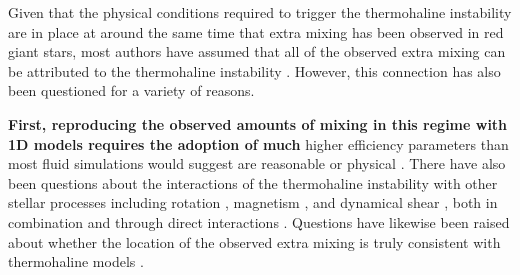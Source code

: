 




Given that the physical conditions required to trigger the thermohaline instability are in place at around the same time that extra mixing has been observed in red giant stars, 
most authors have assumed that all of the observed extra mixing can be attributed to the thermohaline instability \citep[e.g.][]{Kirby2016, Charbonnel2020, Magrini2021a}. However, this connection has also been questioned for a variety of reasons. 

\textbf{First, reproducing the observed amounts of mixing in this regime with 1D models requires the adoption of much} higher efficiency parameters than most fluid simulations would suggest are reasonable or physical \citep{Denissenkov2010thermohaline, denissenkov_merryfield_2011, traxler_etal_2011, brown_etal_2013}. There have also been questions about the interactions of the thermohaline instability with other stellar processes including rotation \citep{Lagarde2011}, magnetism \citep{harrington}, and
dynamical shear \citep{CantielloLanger2010}, both in combination and through direct interactions \citep{Maeder2013, SenguptaGaraud2018,harrington}. 
Questions have likewise been raised about whether the location of the observed extra mixing is truly consistent with thermohaline models \citep[see e.g.][]{Angelou2015, Henkel2017, TayarJoyce22}.

